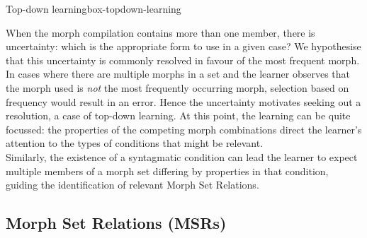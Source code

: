 \largerpage
\begin{dadpbox}{Top-down learning}{box-topdown-learning}

When the morph compilation contains more than one member, there is uncertainty: which is the appropriate form to use in a given case? We hypothesise that this uncertainty is commonly resolved in favour of the most frequent morph. \\

In cases where there are multiple morphs in a set and the learner observes that the morph used is {\it not} the most frequently occurring morph, selection based on frequency would result in an error. Hence the uncertainty motivates seeking out a resolution, a case of top-down learning. At this point, the learning can be quite focussed: the properties of the competing morph combinations direct the learner's attention to the types of conditions that might be relevant.\\

Similarly, the existence of a syntagmatic condition can lead the learner to expect multiple members of a morph set differing by properties in that condition, guiding the identification of relevant Morph Set Relations.
\end{dadpbox}

\subsection{Morph Set Relations (MSRs)} \label{section_MSR_introduction}



